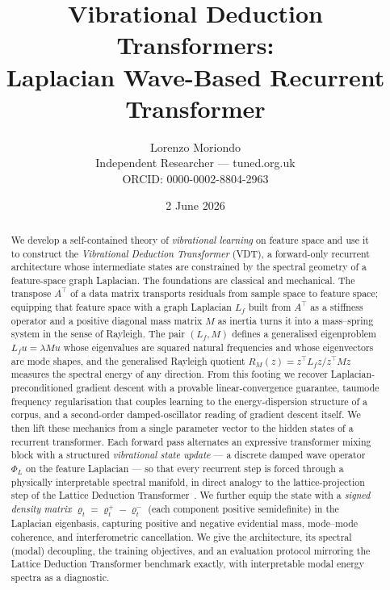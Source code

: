 \documentclass[12pt,a4paper]{article}
\title{Vibrational Deduction Transformers:\\
Laplacian Wave-Based Recurrent Transformer}
\author{Lorenzo Moriondo\\
\small Independent Researcher --- tuned.org.uk\\
\small ORCID: 0000-0002-8804-2963}
\date{2 June 2026}
\theoremstyle{plain}
\theoremstyle{definition}
\theoremstyle{remark}
\newcommand{\1}{\mathbf{1}}
\newcommand{\VDT}{\textsc{VDT}}
\begin{document}
\maketitle

\begin{abstract}
We develop a self-contained theory of \emph{vibrational learning} on
feature space and use it to construct the \emph{Vibrational Deduction
Transformer} (\VDT{}), a forward-only recurrent architecture whose
intermediate states are constrained by the spectral geometry of a
feature-space graph Laplacian.
The foundations are classical and mechanical.
The transpose $A^\top$ of a data matrix transports residuals from sample
space to feature space; equipping that feature space with a graph
Laplacian $L_f$ built from $A^\top$ as a stiffness operator and a
positive diagonal mass matrix $M$ as inertia turns it into a
mass--spring system in the sense of Rayleigh.
The pair $(L_f, M)$ defines a generalised eigenproblem $L_f u = \lambda M u$
whose eigenvalues are squared natural frequencies and whose
eigenvectors are mode shapes, and the generalised Rayleigh quotient
$R_M(z) = z^\top L_f z / z^\top M z$ measures the spectral energy of any
direction.
From this footing we recover Laplacian-preconditioned gradient descent
with a provable linear-convergence guarantee, taumode frequency
regularisation that couples learning to the energy-dispersion structure
of a corpus, and a second-order damped-oscillator reading of gradient
descent itself.
We then lift these mechanics from a single parameter vector to the
hidden states of a recurrent transformer.
Each forward pass alternates an expressive transformer mixing block with
a structured \emph{vibrational state update} --- a discrete damped wave
operator $\Phi_L$ on the feature Laplacian --- so that every recurrent
step is forced through a physically interpretable spectral manifold,
in direct analogy to the lattice-projection step of the Lattice
Deduction Transformer~\cite{davis2026ldt}.
We further equip the state with a \emph{signed density matrix}
$\varrho_t = \varrho_t^{+} - \varrho_t^{-}$ (each component positive
semidefinite) in the Laplacian eigenbasis, capturing positive and
negative evidential mass, mode--mode coherence, and interferometric
cancellation.
We give the architecture, its spectral (modal) decoupling, the training
objectives, and an evaluation protocol mirroring the Lattice Deduction
Transformer benchmark exactly, with interpretable modal energy spectra
as a diagnostic.
\end{abstract}
\end{document}
